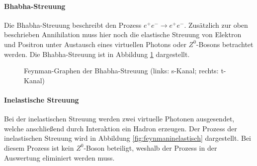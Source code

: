 \paragraph{Bhabha-Streuung}
Die Bhabha-Streuung beschreibt den Prozess $e^+e^-\rightarrow e^+e^-$. Zusätzlich zur oben beschrieben Annihilation muss hier noch die elastische Streuung von Elektron und Positron unter Austausch eines virtuellen Photons oder $Z^0$-Bosons betrachtet werden. Die Bhabha-Streuung ist in Abbildung \ref{fig:feynmanbhabha} dargestellt.


\begin{figure}
	\centering
	\caption[Feynman-Graphen der Bhabha-Streuung]{Feynman-Graphen der Bhabha-Streuung (links: s-Kanal; rechts: t-Kanal)}
	\label{fig:feynmanbhabha}
\end{figure}

\paragraph{Inelastische Streuung}
Bei der inelastischen Streuung werden zwei virtuelle Photonen ausgesendet, welche anschließend durch Interaktion ein Hadron erzeugen. Der Prozess der inelastischen Streuung wird in Abbildung \ref{fig:feynmaninelastisch} dargestellt. Bei diesem Prozess ist kein $Z^0$-Boson beteiligt, weshalb der Prozess in der Auswertung eliminiert werden muss.

